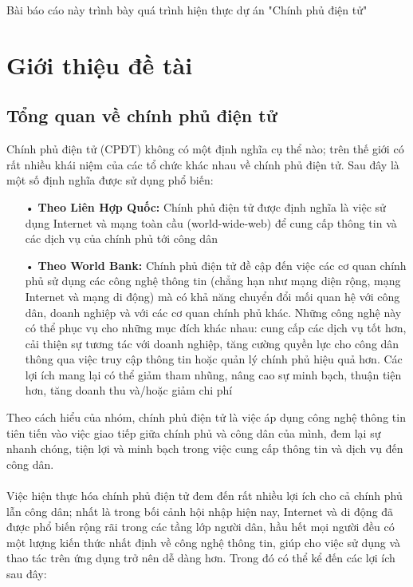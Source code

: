 \documentclass[a4paper]{article}
\begin{document}

\newpage
\tableofcontents
\newpage

Bài báo cáo này trình bày quá trình hiện thực dự án "Chính phủ điện tử" 

\section{Giới thiệu đề tài}
\subsection{Tổng quan về chính phủ điện tử}
Chính phủ điện tử (CPĐT) không có một định nghĩa cụ thể nào; trên thế giới có rất nhiều khái niệm của các tổ chức khác nhau về chính phủ điện tử. Sau đây là một số định nghĩa được sử dụng phổ biến:
\begin{itemize}
	\item[•]\textbf{Theo Liên Hợp Quốc: }Chính phủ điện tử được định nghĩa là việc sử dụng Internet và mạng toàn cầu (world-wide-web) để cung cấp thông tin và các dịch vụ của chính phủ tới công dân \cite{bib1}
	\item[•]\textbf{Theo World Bank: }Chính phủ điện tử đề cập đến việc các cơ quan chính phủ sử dụng các công nghệ thông tin (chẳng hạn như mạng diện rộng, mạng Internet và mạng di động) mà có khả năng chuyển đổi mối quan hệ với công dân, doanh nghiệp và với các cơ quan chính phủ khác. Những công nghệ này có thể phục vụ cho những mục đích khác nhau: cung cấp các dịch vụ tốt hơn, cải thiện sự tương tác với doanh nghiệp, tăng cường quyền lực cho công dân thông qua việc truy cập thông tin hoặc quản lý chính phủ hiệu quả hơn. Các lợi ích mang lại có thể giảm tham nhũng, nâng cao sự minh bạch, thuận tiện hơn, tăng doanh thu và/hoặc giảm chi phí \cite{bib2}
\end{itemize}
Theo cách hiểu của nhóm, chính phủ điện tử là việc áp dụng công nghệ thông tin tiên tiến vào việc giao tiếp giữa chính phủ và công dân của mình, đem lại sự nhanh chóng, tiện lợi và minh bạch trong việc cung cấp thông tin và dịch vụ đến công dân.\\
\\
Việc hiện thực hóa chính phủ điện tử đem đến rất nhiều lợi ích cho cả chính phủ lẫn công dân; nhất là trong bối cảnh hội nhập hiện nay, Internet và di động đã được phổ biến rộng rãi trong các tầng lớp người dân, hầu hết mọi người đều có một lượng kiến thức nhất định về công nghệ thông tin, giúp cho việc sử dụng và thao tác trên ứng dụng trở nên dễ dàng hơn. Trong đó có thể kể đến các lợi ích sau đây:
\end{document}
